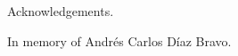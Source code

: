 Acknowledgements.

\pagebreak
\hspace{0pt}
\vfill

\begin{center}
\begin{minipage}{.7\linewidth}
In memory of Andr\'{e}s Carlos D\'{i}az Bravo.
\end{minipage}
\end{center}

\vfill
\hspace{0pt}
\pagebreak
